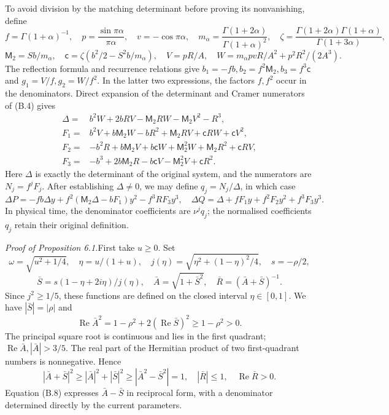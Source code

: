 \documentclass[11pt,a4paper]{article}
\newcommand{\proofhead}[1]{\par\addvspace{0.3\baselineskip}\noindent\textit{#1.}\enspace}
\begin{document}
To avoid division by the matching determinant before proving its nonvanishing, define
\[
f=\Gamma(1+\alpha)^{-1},\quad p=\frac{\sin\pi\alpha}{\pi\alpha},
\quad v=-\cos\pi\alpha,\quad
m_\alpha=\frac{\Gamma(1+2\alpha)}{\Gamma(1+\alpha)^2},\quad
\zeta=\frac{\Gamma(1+2\alpha)\Gamma(1+\alpha)}{\Gamma(1+3\alpha)},
\]
\begin{equation*}\tag{B.5}
\mathsf M_2=Sb/m_\alpha,\quad
\mathsf c=\zeta(b^2/2-S^2b/m_\alpha),\quad
V=pR/A,\quad W=m_\alpha p v R/A^2+p^2R^2/(2A^3).
\end{equation*}
The reflection formula and recurrence relations give \(b_1=-fb,b_2=f^2\mathsf M_2,b_3=f^3\mathsf c\) and \(g_1=V/f,g_2=W/f^2\). In the latter two expressions, the factors \(f,f^2\) occur in the denominators. Direct expansion of the determinant and Cramer numerators of (B.4) gives
\begin{equation*}\tag{B.6}
\begin{aligned}
\Delta={}&b^2W+2bRV-\mathsf M_2RW-\mathsf M_2V^2-R^3,\\
F_1={}&b^2V+b\mathsf M_2W-bR^2+\mathsf M_2RV+\mathsf cRW+\mathsf cV^2,\\
F_2={}&-b^2R+b\mathsf M_2V+b\mathsf cW+\mathsf M_2^2W+\mathsf M_2R^2+\mathsf cRV,\\
F_3={}&-b^3+2b\mathsf M_2R-b\mathsf cV-\mathsf M_2^2V+\mathsf cR^2.
\end{aligned}
\end{equation*}
Here \(\Delta\) is exactly the determinant of the original system, and the numerators are \(N_j=f^jF_j\). After establishing \(\Delta\ne0\), we may define \(q_j=N_j/\Delta\), in which case
\begin{equation*}\tag{B.7}
\Delta P=-fb\Delta y+f^2(\mathsf M_2\Delta-bF_1)y^2-f^3RF_3y^3,\quad
\Delta Q=\Delta+fF_1y+f^2F_2y^2+f^3F_3y^3.
\end{equation*}
In physical time, the denominator coefficients are \(\nu^jq_j\); the normalised coefficients \(q_j\) retain their original definition.

\proofhead{Proof of Proposition 6.1}First take \(u\ge0\). Set
\[
\omega=\sqrt{u^2+1/4},\quad \eta=u/(1+u),\quad
j(\eta)=\sqrt{\eta^2+(1-\eta)^2/4},\quad s=-\rho/2,
\]
\begin{equation*}\tag{B.8}
\bar S=s(1-\eta+2i\eta)/j(\eta),\quad
\bar A=\sqrt{1+\bar S^2},\quad \bar R=(\bar A+\bar S)^{-1}.
\end{equation*}
Since \(j^2\ge1/5\), these functions are defined on the closed interval \(\eta\in[0,1]\). We have \(|\bar S|=|\rho|\) and
\[
\operatorname{Re}\bar A^2
=1-\rho^2+2(\operatorname{Re}\bar S)^2\ge1-\rho^2>0.
\]
The principal square root is continuous and lies in the first quadrant; \(\operatorname{Re}\bar A,|\bar A|>3/5\). The real part of the Hermitian product of two first-quadrant numbers is nonnegative. Hence
\[
|\bar A+\bar S|^2\ge|\bar A|^2+|\bar S|^2
\ge|\bar A^2-\bar S^2|=1,\quad
|\bar R|\le1,\quad\operatorname{Re}\bar R>0.
\]
Equation (B.8) expresses \(\bar A-\bar S\) in reciprocal form, with a denominator determined directly by the current parameters.
\end{document}
